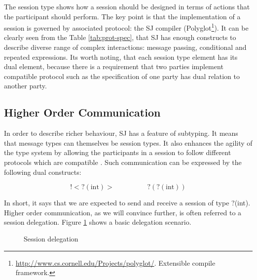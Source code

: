 \documentclass{llncs}
\begin{document}
The session type shows how a session should be designed in terms of actions that the participant should perform. The key point is that the implementation of a session is governed by associated protocol: the SJ compiler (Polyglot\footnote{\url{http://www.cs.cornell.edu/Projects/polyglot/}. Extensible compile framework.}). It can be clearly seen from the Table \ref{tab:prot-spec}, that SJ has enough constructs to describe diverse range of complex interactions: message passing, conditional and repeated expressions. Its worth noting, that each session type element has its dual element, because there is a requirement that two parties implement compatible protocol such as the specification of one party has dual relation to another party.

\subsection{Higher Order Communication}
In order to describe richer behaviour, SJ has a feature of subtyping. It means that message types can themselves be session types. It also enhances the agility of the type system by allowing the participants in a session to follow different protocols which are compatible \cite{higher-order-comm}. Such communication can be expressed by the following dual constructs:

\begin{equation*}
!<?(\text{int})> \hspace{2cm} ?(?(\text{int}))
\end{equation*}

In short, it says that we are expected to send and receive a session of type ?(int). Higher order communication, as we will convince further, is often referred to a session delegation. Figure \ref{fig:sj-delegation} shows a basic delegation scenario.

\begin{figure}[ht]
\centering
{}
\caption{Session delegation}\label{fig:sj-delegation}
\end{figure}
\end{document}
